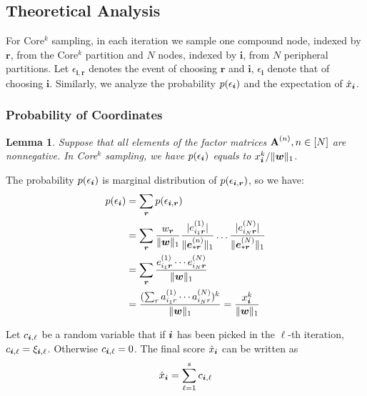 \documentclass[10pt,journal,compsoc]{IEEEtran}
\newcommand{\Sca}[3]{{#1}^{(#2)}_{i_#2#3}}%
\newcommand{\anr}[2]{\Sca{a}{#1}{#2}}
\newcommand{\score}[1]{\xi_{\V{i},#1}}
\newcommand{\V}[1]{{\boldsymbol{{\MakeLowercase{#1}}}}}
\newcommand{\ColVec}[3]{\V{#1}^{(#2)}_{#3}}
\newcommand{\predx}{\hat{x}_{\V{i}}}
\newcommand{\M}[1]{{\textbf{{\MakeUppercase{#1}}}}}
\newcommand{\norm}[2]{\|#1\|_{#2}}
\newtheorem{lemma}{Lemma}
\begin{document}
\subsection{Theoretical Analysis}

For Core$^k$ sampling, in each iteration we sample one compound node, indexed by $\boldsymbol{r}$, from the Core$^k$ partition and $N$ nodes, indexed by $\boldsymbol{i}$, from $N$ peripheral partitions. Let $\epsilon_{\boldsymbol{i},\boldsymbol{r}}$ denotes the event of choosing $\boldsymbol{r}$ and $\boldsymbol{i}$, $\epsilon_{\boldsymbol{i}}$ denote that of choosing $\boldsymbol{i}$. Similarly, we analyze the probability $p(\epsilon_{\V{i}})$ and the expectation of $\predx$.

\subsubsection{Probability of Coordinates}

\begin{lemma}\label{lem:Probability}
	Suppose that all elements of the factor matrices $\M{A}^{(n)}, n\in[N]$ are nonnegative. 
	In Core$^k$ sampling, we have $p(\epsilon_{\V{i}})$ equals to $x^k_{\V{i}}/\norm{\V{w}}{1}$.
\end{lemma}

\begin{IEEEproof}
	The probability $p(\epsilon_{\V{i}})$ is marginal distribution of $p(\epsilon_{\V{i},\V{r}})$,
	so we have:
	\begin{align*}
	p(\epsilon_{\V{i}})
	& = \sum_{\V{r}} p(\epsilon_{\V{i},\V{r}}) \\
	& = \sum_{\V{r}} \frac{w_{\V{r}}}{\norm{\V{W}}{1}}
	\frac{|\Sca{e}{1}{\V{r}}|}{\norm{\ColVec{e}{n}{*\V{r}}}{1}}\ldots\frac{|\Sca{e}{N}{\V{r}}|}{\norm{\ColVec{e}{N}{*\V{r}}}{1}}\\
	& = \sum_{\V{r}} \frac{\Sca{e}{1}{\V{r}}\cdots\Sca{e}{N}{\V{r}}}{\norm{\V{W}}{1}}\\
	& = \frac{(\sum_{r}\anr{1}{r}\cdots\anr{N}{r})^k}{\norm{\V{W}}{1}}
	= \frac{x^k_{\V{i}}}{\norm{\V{w}}{1}}
	\end{align*}
\end{IEEEproof}

Let $c_{\V{i},\ell}$ be a random variable that if $\V{i}$ has been picked in the $\ell$-th iteration, $c_{\V{i},\ell}=\score{\ell}$. Otherwise $c_{\V{i},\ell}=0$. The final score $\predx$ can be written as
\begin{equation}\label{eq:CorekScore}
\predx = \sum_{\ell=1}^{s} c_{\V{i},\ell}
\end{equation}
\end{document}
